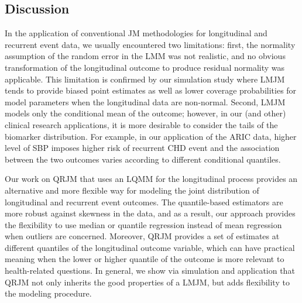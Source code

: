 








% 



\subsection{Discussion}\label{sec:p2discussion}
In the application of conventional JM methodologies for longitudinal and recurrent event data, we usually encountered two limitations: first, the normality assumption of the random error in the LMM was not realistic, and no obvious transformation of the longitudinal outcome to produce residual normality was applicable. This limitation is confirmed by our simulation study where LMJM tends to provide biased point estimates as well as lower coverage probabilities for model parameters when the longitudinal data are non-normal. Second, LMJM models only the conditional mean of the outcome; however, in our (and other) clinical research applications, it is more desirable to consider the tails of the biomarker distribution. For example, in our application of the ARIC data, higher level of SBP imposes higher risk of recurrent CHD event and the association between the two outcomes varies according to different conditional quantiles.

Our work on QRJM that uses an LQMM for the longitudinal process provides an alternative and more flexible way for modeling the joint distribution of longitudinal and recurrent event outcomes. The quantile-based estimators are more robust against skewness in the data, and as a result, our approach provides the flexibility to use median or quantile regression instead of mean regression when outliers are concerned. Moreover, QRJM provides a set of estimates at different quantiles of the longitudinal outcome variable, which can have practical meaning when the lower or higher quantile of the outcome is more relevant to health-related questions. In general, we show via simulation and application that QRJM not only inherits the good properties of a LMJM, but adds flexibility to the modeling procedure.

